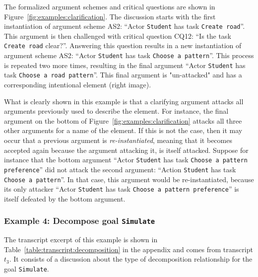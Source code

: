 The formalized argument schemes and critical questions are shown in Figure~\ref{fig:examples:clarification}. The discussion starts with the first instantiation of argument scheme AS2: ``Actor \texttt{Student} has task \texttt{Create road}''. %
This argument is then challenged with critical question CQ12: ``Is the task \texttt{Create road} clear?''. Answering this question results in a new instantiation of argument scheme AS2: ``Actor \texttt{Student} has task \texttt{Choose a pattern}''. %
This process is repeated two more times, resulting in the final argument ``Actor \texttt{Student} has task \texttt{Choose a road pattern}''. This final argument is "un-attacked" and has a corresponding intentional element (right image). 

What is clearly shown in this example is that a clarifying argument attacks all arguments previously used to describe the element. For instance, the final argument on the bottom of Figure~\ref{fig:examples:clarification} attacks all three other arguments for a name of the element. If this is not the case, then it may occur that a previous argument is \emph{re-instantiated}, meaning that it becomes accepted again because the argument attacking it, is itself attacked. Suppose for instance that the bottom argument ``Actor \texttt{Student} has task \texttt{Choose a pattern preference}'' did not attack the second argument: ``Action \texttt{Student} has task \texttt{Choose a pattern}''. In that case, this argument would be re-instantiated, because its only attacker ``Actor \texttt{Student} has task \texttt{Choose a pattern preference}'' is itself defeated by the bottom argument. %

\subsubsection{Example 4: Decompose goal \texttt{Simulate}} %

The transcript excerpt of this example is shown in Table~\ref{table:transcript:decomposition} in the appendix and comes from transcript $t_3$. It consists of a discussion about the type of decomposition relationship for the goal \texttt{Simulate}.

